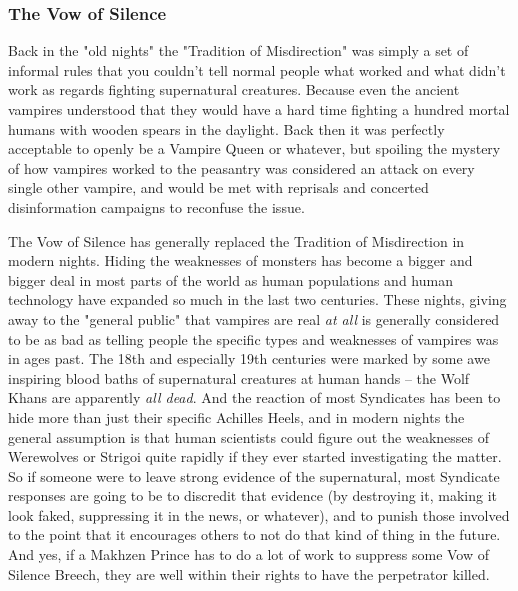 \subsubsection{The Vow of Silence}
\hspace{\parindent} Back in the "old nights" the "Tradition of Misdirection" was simply a set of informal rules that you couldn't tell normal people what worked and what didn't work as regards fighting supernatural creatures. Because even the ancient vampires understood that they would have a hard time fighting a hundred mortal humans with wooden spears in the daylight. Back then it was perfectly acceptable to openly be a Vampire Queen or whatever, but spoiling the mystery of how vampires worked to the peasantry was considered an attack on every single other vampire, and would be met with reprisals and concerted disinformation campaigns to reconfuse the issue.

The Vow of Silence has generally replaced the Tradition of Misdirection in modern nights. Hiding the weaknesses of monsters has become a bigger and bigger deal in most parts of the world as human populations and human technology have expanded so much in the last two centuries. These nights, giving away to the "general public" that vampires are real \textit{at all} is generally considered to be as bad as telling people the specific types and weaknesses of vampires was in ages past. The 18th and especially 19th centuries were marked by some awe inspiring blood baths of supernatural creatures at human hands -- the Wolf Khans are apparently \textit{all dead}. And the reaction of most Syndicates has been to hide more than just their specific Achilles Heels, and in modern nights the general assumption is that human scientists could figure out the weaknesses of Werewolves or Strigoi quite rapidly if they ever started investigating the matter. So if someone were to leave strong evidence of the supernatural, most Syndicate responses are going to be to discredit that evidence (by destroying it, making it look faked, suppressing it in the news, or whatever), and to punish those involved to the point that it encourages others to not do that kind of thing in the future. And yes, if a Makhzen Prince has to do a lot of work to suppress some Vow of Silence Breech, they are well within their rights to have the perpetrator killed.

